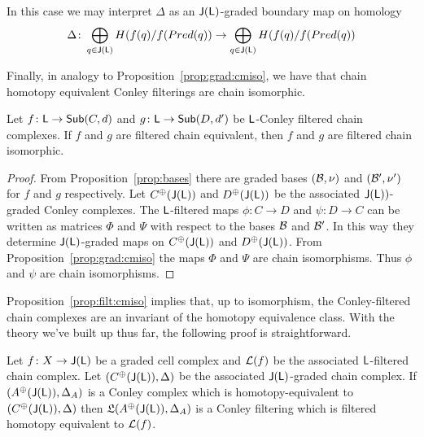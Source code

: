 In this case we may interpret $\Delta$ as an ${\mathsf J}({\mathsf L})$-graded boundary map on homology
\[
\Delta \colon \bigoplus_{q\in {\mathsf J}({\mathsf L})} H(f(q)/f(Pred(q)) \to \bigoplus_{q\in {\mathsf J}({\mathsf L})} H(f(q)/f(Pred(q))
\]


Finally, in analogy to Proposition~\ref{prop:grad:cmiso}, we have that chain homotopy equivalent Conley filterings are chain isomorphic.

 \begin{prop}\label{prop:filt:cmiso}
 Let $f\colon {\mathsf L}\to \mathsf{Sub}(C,d)$ and $g\colon {\mathsf L}\to \mathsf{Sub}(D,d')$ be ${\mathsf L}$-Conley filtered chain complexes.  If $f$ and $g$ are filtered chain equivalent, then $f$ and $g$ are filtered chain isomorphic.
 
 \end{prop}
 \begin{proof}
From Proposition~\ref{prop:bases} there are graded bases $({\mathcal B},\nu)$ and $({\mathcal B}',\nu')$ for $f$ and $g$ respectively.  Let $C^\oplus({\mathsf J}({\mathsf L}))$ and $D^\oplus({\mathsf J}({\mathsf L}))$ be the associated ${\mathsf J}({\mathsf L}))$-graded Conley complexes.  The ${\mathsf L}$-filtered maps $\phi\colon C\to D$ and $\psi\colon D\to C$ can be written as matrices $\Phi$ and $\Psi$ with respect to the bases ${\mathcal B}$ and ${\mathcal B}'$.  In this way they determine ${\mathsf J}({\mathsf L})$-graded maps on $C^\oplus({\mathsf J}({\mathsf L}))$ and $D^\oplus({\mathsf J}({\mathsf L}))$.  From Proposition~\ref{prop:grad:cmiso} the maps $\Phi$ and $\Psi$ are chain isomorphisms.  Thus $\phi$ and $\psi$ are chain isomorphisms.
  \end{proof}
  
  Proposition~\ref{prop:filt:cmiso} implies that, up to isomorphism, the Conley-filtered chain complexes are an invariant of the homotopy equivalence class.   With the theory we've built up thus far, the following proof is straightforward.

\begin{thm}
Let $f\colon X\to {\mathsf J}({\mathsf L})$ be a graded cell complex and ${\mathcal L}(f)$ be the associated ${\mathsf L}$-filtered chain complex.  Let $(C^\oplus({\mathsf J}({\mathsf L})),\Delta)$ be the associated ${\mathsf J}({\mathsf L})$-graded chain complex.  If $(A^\oplus({\mathsf J}({\mathsf L})),\Delta_A)$ is a Conley complex which is homotopy-equivalent to $(C^\oplus({\mathsf J}({\mathsf L})),\Delta)$ then $\mathfrak{L}(A^\oplus({\mathsf J}({\mathsf L})),\Delta_A)$ is a Conley filtering which is filtered homotopy equivalent to ${\mathcal L}(f)$.
\end{thm}

